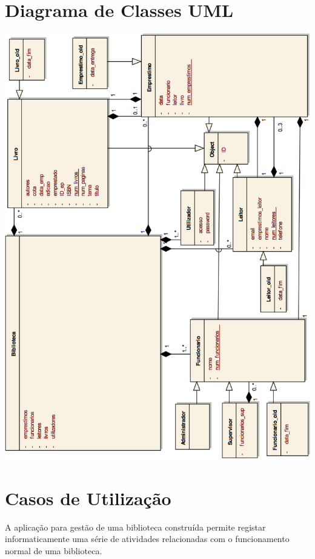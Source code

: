 \documentclass[12pt,a4paper,reqno]{report}
\numberwithin{figure}{section}
\numberwithin{equation}{section}
\begin{document}
\chapter{Diagrama de Classes UML}

\begin{center}

\includegraphics[width=14cm]{UML.jpg}

\end{center}

\chapter{Casos de Utilização}

A aplicação para gestão de uma biblioteca construída permite registar informaticamente uma série de atividades relacionadas com o funcionamento normal de uma biblioteca.
\end{document}
